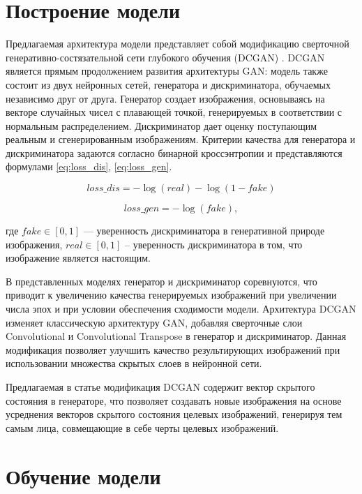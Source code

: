\documentclass[60x84/16,8pt]{ittmm}
\begin{document}
\section{Построение модели} 
\label{sec:base-section}

Предлагаемая архитектура модели представляет собой модификацию
сверточной генеративно-состязательной сети глубокого обучения (DCGAN) \cite{dcgan}.
DCGAN является прямым продолжением развития архитектуры GAN: модель также 
состоит из двух нейронных сетей, генератора и дискриминатора, обучаемых независимо друг от друга.
Генератор создает изображения, основываясь на векторе случайных чисел с плавающей точкой,
генерируемых в соответствии с нормальным распределением. Дискриминатор дает оценку поступающим
реальным и сгенерированным изображениям. Критерии качества для генератора и дискриминатора задаются согласно
бинарной кроссэнтропии и представляются формулами \eqref{eq:loss_dis}, \eqref{eq:loss_gen}.

\begin{equation}
  loss\_dis=-\log(real) - \log(1-fake)
  \label{eq:loss_dis}
\end{equation}

\begin{equation}
  loss\_gen=-\log(fake),
  \label{eq:loss_gen}
\end{equation}

где \(fake \in [0, 1]\) --- уверенность дискриминатора в генеративной природе изображения,
\(real \in [0, 1]\) -- уверенность дискриминатора в том, что изображение является настоящим.

В представленных моделях генератор и дискриминатор соревнуются, что приводит
к увеличению качества генерируемых изображений при увеличении числа эпох и
при условии обеспечения сходимости модели. Архитектура DCGAN изменяет классическую архитектуру GAN,
добавляя сверточные слои Convolutional и Convolutional Transpose в генератор и дискриминатор.
Данная модификация позволяет улучшить качество результирующих изображений при использовании
множества скрытых слоев в нейронной сети.

Предлагаемая в статье модификация DCGAN содержит вектор скрытого состояния
в генераторе, что позволяет создавать новые изображения на основе усреднения
векторов скрытого состояния целевых изображений, генерируя тем самым лица,
совмещающие в себе черты целевых изображений.

\section{Обучение модели}
\label{sec:base-section}
\end{document}
